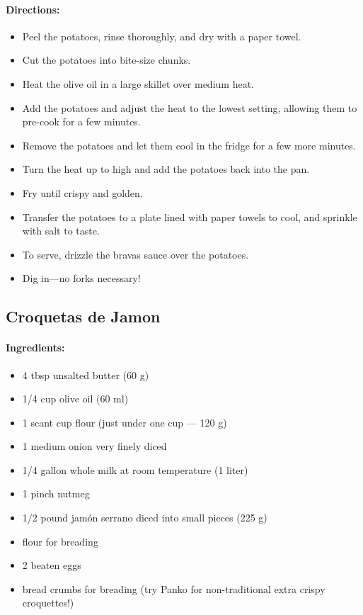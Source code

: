 \documentclass{article}
\begin{document}
\paragraph{Directions:}
\begin{itemize}
	\item Peel the potatoes, rinse thoroughly, and dry with a paper towel.
	\item Cut the potatoes into bite-size chunks.
	\item Heat the olive oil in a large skillet over medium heat.
	\item Add the potatoes and adjust the heat to the lowest setting, allowing them to pre-cook for a few minutes.
	\item Remove the potatoes and let them cool in the fridge for a few more minutes.
	\item Turn the heat up to high and add the potatoes back into the pan.
	\item Fry until crispy and golden.
	\item Transfer the potatoes to a plate lined with paper towels to cool, and sprinkle with salt to taste.
	\item To serve, drizzle the bravas sauce over the potatoes.
	\item Dig in—no forks necessary!
\end{itemize}

\subsection{Croquetas de Jamon}

\paragraph{Ingredients:}

\begin{itemize}
	\item 4 tbsp unsalted butter (60 g)
	\item 1/4 cup olive oil (60 ml)
	\item 1 scant cup flour (just under one cup — 120 g)
	\item 1 medium onion very finely diced
	\item 1/4 gallon whole milk at room temperature (1 liter)
	\item 1 pinch nutmeg
	\item 1/2 pound jamón serrano diced into small pieces (225 g)
	\item flour for breading
	\item 2 beaten eggs
	\item bread crumbs for breading (try Panko for non-traditional extra crispy croquettes!)
\end{itemize}
\end{document}
